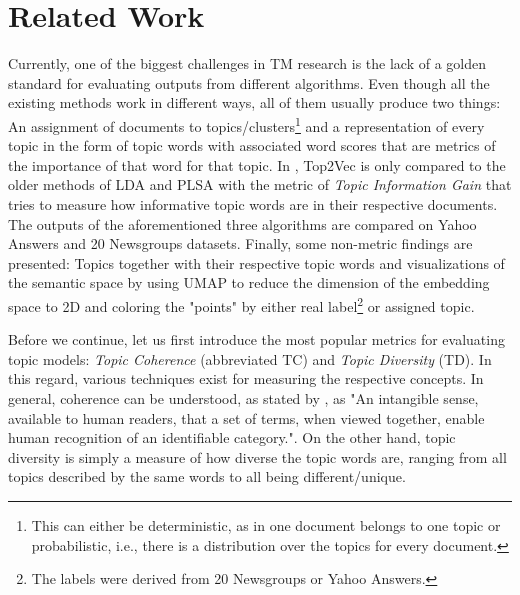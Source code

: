 \documentclass[11pt]{article}
\begin{document}
\section{Related Work}
Currently, one of the biggest challenges in TM research is the lack of a golden standard for evaluating outputs from different algorithms. Even though all the existing methods work in different ways, all of them usually produce two things: An assignment of documents to topics/clusters\footnote{This can either be deterministic, as in one document belongs to one topic or probabilistic, i.e., there is a distribution over the topics for every document.} and a representation of every topic in the form of topic words with associated word scores that are metrics of the importance of that word for that topic.
In \citet{top2vec}, Top2Vec is only compared to the older methods of LDA and PLSA with the metric of \emph{Topic Information Gain} that tries to measure how informative topic words are in their respective documents. 
The outputs of the aforementioned three algorithms are compared on Yahoo Answers and 20 Newsgroups datasets. Finally, some non-metric findings are presented: Topics together with their respective topic words and visualizations of the semantic space by using UMAP to reduce the dimension of the embedding space to 2D and coloring the "points" by either real label\footnote{The labels were derived from 20 Newsgroups or Yahoo Answers.} or assigned topic. 

Before we continue, let us first introduce the most popular metrics for evaluating topic models: \emph{Topic Coherence} (abbreviated TC) and \emph{Topic Diversity} (TD). In this regard, various techniques exist for measuring the respective concepts. In general, coherence can be understood, as stated by \citet{incoherence}, as "An intangible sense, available to human readers, that a set of terms, when viewed together, enable human recognition of an identifiable category.". On the other hand, topic diversity is simply a measure of how diverse the topic words are, ranging from all topics described by the same words to all being different/unique. 
\end{document}
